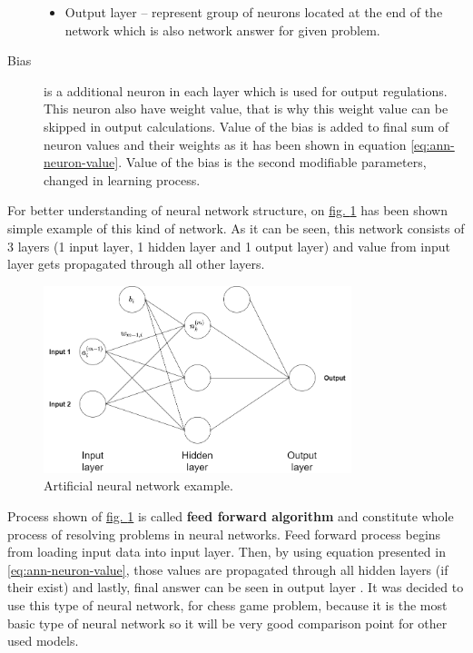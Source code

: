 \begin{description}
\begin{itemize}
            \item Output layer -- represent group of neurons located at the end of the network which is also network answer for given problem.
        \end{itemize}
        \item[Bias] is a additional neuron in each layer which is used for output regulations. This neuron also have weight value, that is why this weight value can be skipped in output calculations. Value of the bias is added to final sum of neuron values and their weights as it has been shown in equation \ref{eq:ann-neuron-value}. Value of the bias is the second modifiable parameters, changed in learning process.
    \end{description}
    For better understanding of neural network structure, on \hyperref[fig:ann-example]{fig. \ref*{fig:ann-example}} has been shown simple example of this kind of network. As it can be seen, this network consists of 3 layers (1 input layer, 1 hidden layer and 1 output layer) and value from input layer gets propagated through all other layers.
    \begin{figure}
        \centering
        \includegraphics[width=0.8\textwidth]{dependencies/pictures/NN_example.png}
        \caption{Artificial neural network example.}
        \label{fig:ann-example}
    \end{figure}
    Process shown of \hyperref[fig:ann-example]{fig. \ref*{fig:ann-example}} is called \textbf{feed forward algorithm} and constitute whole process of resolving problems in neural networks. Feed forward process begins from loading input data into input layer. Then, by using equation presented in \ref{eq:ann-neuron-value}, those values are propagated through all hidden layers (if their exist) and lastly, final answer can be seen in output layer \cite{bib:book-make-own-neural-network,bib:article-application-of-feedforward-for-grade-estimation,bib:internet-neural-network-and-deep-learning}. It was decided to use this type of neural network, for chess game problem, because it is the most basic type of neural network so it will be very good comparison point for other used models.

